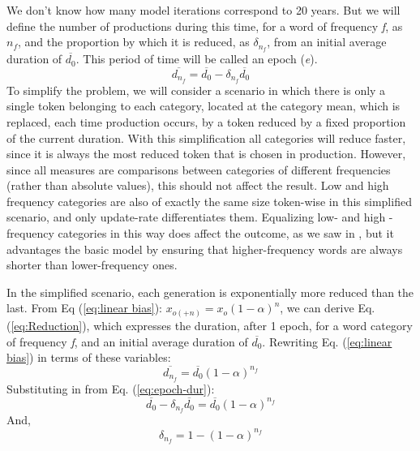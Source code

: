 We don't know how many model iterations correspond to 20 years. But
we will define the number of productions during this time, for a word
of frequency \emph{f}, as $n_{f}$, and the proportion by which it
is reduced, as $\delta_{n_{f}}$, from an initial average duration
of $\overline{d_{0}}$. This period of time will be called an epoch
(\emph{e}). 
\begin{equation}
\overline{d_{n_{f}}}=\overline{d_{0}}-\delta_{n_{f}}\overline{d_{0}}\label{eq:epoch-dur}
\end{equation}
To simplify the problem, we will consider a scenario in which there
is only a single token belonging to each category, located at the
category mean, which is replaced, each time production occurs, by
a token reduced by a fixed proportion of the current duration. With
this simplification all categories will reduce faster, since it is
always the most reduced token that is chosen in production. However,
since all measures are comparisons between categories of different
frequencies (rather than absolute values), this should not affect
the result. Low and high frequency categories are also of exactly
the same size token-wise in this simplified scenario, and only update-rate
differentiates them. Equalizing low- and high -frequency categories
in this way does affect the outcome, as we saw in ,
but it advantages the basic model by ensuring that higher-frequency
words are always shorter than lower-frequency ones.

In the simplified scenario, each generation is exponentially more
reduced than the last. From Eq (\ref{eq:linear bias}): $x_{o(+n)}=x_{o}\left(1-\alpha\right)^{n}$,
we can derive Eq. (\ref{eq:Reduction}), which expresses the duration,
after 1 epoch, for a word category of frequency \emph{f}, and an
initial average duration of $\overline{d_{0}}$. Rewriting Eq. (\ref{eq:linear bias})
in terms of these variables:
\begin{equation}
\overline{d_{n_{f}}}=\overline{d_{0}}(1-\alpha)^{n_{f}}
\end{equation}
Substituting in from Eq. (\ref{eq:epoch-dur}):
\begin{equation}
\overline{d_{0}}-\delta_{n_{f}}\overline{d_{0}}=\overline{d_{0}}(1-\alpha)^{n_{f}}
\end{equation}
And, 
\begin{equation}
\delta_{n_{f}}=1-(1-\alpha)^{n_{f}}\label{eq:Reduction}
\end{equation}

